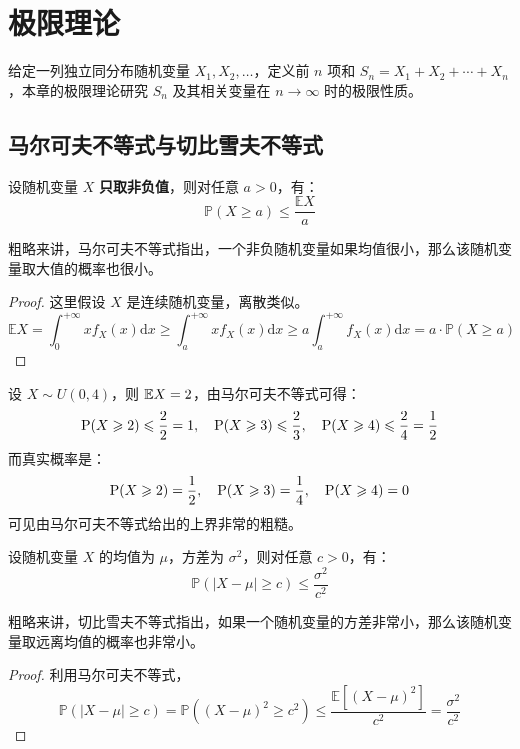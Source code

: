 \section{极限理论}

给定一列独立同分布随机变量 $X_1,X_2,\ldots$，定义前 $n$ 项和 $S_n=X_1+X_2+\cdots+X_n$，本章的极限理论研究 $S_n$ 及其相关变量在 $n\to\infty$ 时的极限性质。


\subsection{马尔可夫不等式与切比雪夫不等式}

\begin{theorem}[马尔可夫不等式]
设随机变量 $X$ \textbf{只取非负值}，则对任意 $a>0$，有：
\[
\mathbb P(X\geq a)\leq \frac{\mathbb EX}{a}
\]
\end{theorem}
\begin{com}
粗略来讲，马尔可夫不等式指出，一个非负随机变量如果均值很小，那么该随机变量取大值的概率也很小。
\end{com}
\begin{proof}
这里假设 $X$ 是连续随机变量，离散类似。
\[
\mathbb EX=\int_0^{+\infty}xf_X(x)\mathrm dx\geq \int_a^{+\infty}xf_X(x)\mathrm dx\geq a\int_a^{+\infty}f_X(x)\mathrm dx=a\cdot\mathbb P(X\geq a)
\]
\end{proof}

\begin{example}
\label{ex:markov}
设 $X\sim U(0,4)$，则 $\mathbb{E} X=2$，由马尔可夫不等式可得：
\[
\mathrm{P}(X\geqslant2)\leqslant\frac{2}{2}=1,\quad\mathrm{P}(X\geqslant 3)\leqslant\frac{2}{3},\quad\mathrm{P}(X\geqslant 4)\leqslant\frac{2}{4}=\frac{1}{2}
\]
而真实概率是：
\[
\mathrm{P}(X\geqslant2)=\frac{1}{2},\quad\mathrm{P}(X\geqslant 3)=\frac{1}{4},\quad\mathrm{P}(X\geqslant 4)=0
\]
可见由马尔可夫不等式给出的上界非常的粗糙。
\end{example}

\begin{theorem}[切比雪夫不等式]
设随机变量 $X$ 的均值为 $\mu$，方差为 $\sigma^2$，则对任意 $c>0$，有：
\[
\mathbb P(|X-\mu|\geq c)\leq \frac{\sigma^2}{c^2}
\]
\end{theorem}
\begin{com}
粗略来讲，切比雪夫不等式指出，如果一个随机变量的方差非常小，那么该随机变量取远离均值的概率也非常小。
\end{com}
\begin{proof}
利用马尔可夫不等式，
\[
\mathbb P(|X-\mu|\geq c)=\mathbb P((X-\mu)^2\geq c^2)\leq \frac{\mathbb E[(X-\mu)^2]}{c^2}=\frac{\sigma^2}{c^2}
\]
\end{proof}

